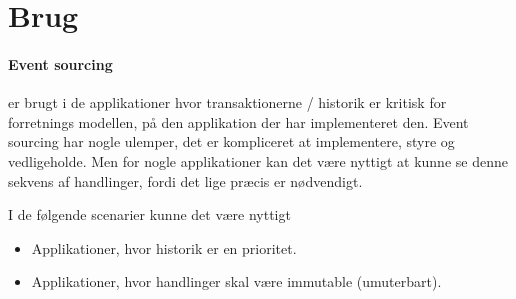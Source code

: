 \section{Brug}

\paragraph{Event sourcing} er brugt i de applikationer hvor transaktionerne / historik er kritisk for forretnings modellen, på den applikation der har implementeret den. Event sourcing har nogle ulemper, det er kompliceret at implementere, styre og vedligeholde. Men for nogle applikationer kan det være nyttigt at kunne se denne sekvens af handlinger, fordi det lige præcis er nødvendigt. 

I de følgende scenarier kunne det være nyttigt

\begin{itemize}  
    \item Applikationer, hvor historik er en prioritet.
    \item Applikationer, hvor handlinger skal være immutable (umuterbart).
\end{itemize}